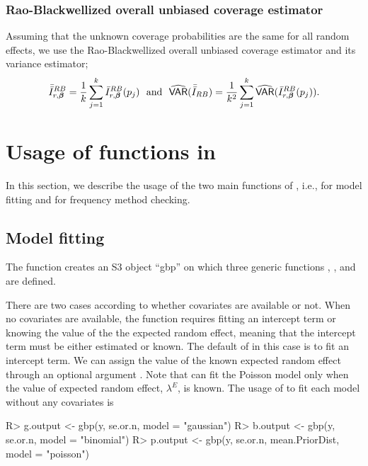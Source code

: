 \documentclass[article]{jss}
\begin{document}
\subsubsection{Rao-Blackwellized overall unbiased coverage estimator}\label{overallRB} Assuming that the unknown  coverage probabilities are the same for all random effects, we use the Rao-Blackwellized overall unbiased coverage estimator and its variance estimator;
\begin{equation}\label{RBoverall}
\bar{\bar{I}}^{RB}_{r, \boldsymbol{\beta}} = \frac{1}{k}\sum_{j=1}^k\bar{I}^{RB}_{r, \boldsymbol{\beta}}(p_j)~~\textrm{and}~~ \widehat{\mathsf{VAR}}(\bar{\bar{I}}_{RB})=\frac{1}{k^2}\sum_{j=1}^k\widehat{\mathsf{VAR}}(\bar{I}^{RB}_{r, \boldsymbol{\beta}}(p_j)).
\end{equation}


\section[packageoverview]{Usage of functions in }\label{sec5}
In this section, we describe the usage of the two main functions of , i.e.,  for model fitting and  for frequency method checking. 

\subsection{Model fitting}
The function  creates an S3 object ``gbp'' on which  three generic functions , , and  are defined. %

There are two cases according to whether covariates are available or not. When no covariates are available, the function  requires fitting an intercept term  or knowing the value of the  the expected random effect, meaning that the intercept term must be either estimated or known. The default of  in this case is to fit an intercept term. We can assign the value of the known expected random effect through an optional argument . Note that  can fit the Poisson model only when the value of expected random effect, $\lambda^E$, is known. The usage of  to  fit each model without any covariates is 
\begin{CodeChunk}
\begin{CodeInput}
R> g.output <- gbp(y, se.or.n, model = "gaussian")
R> b.output <- gbp(y, se.or.n, model = "binomial")
R> p.output <- gbp(y, se.or.n, mean.PriorDist, model = "poisson")
\end{CodeInput}
\end{CodeChunk}
\end{document}
